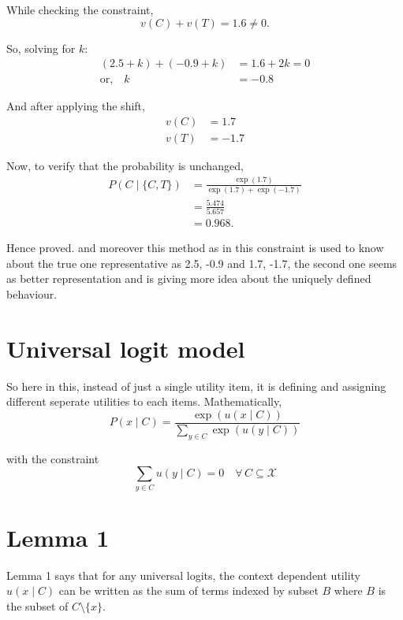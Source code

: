 While checking the constraint,
\begin{equation*}
    v(C) + v(T) = 1.6 \neq 0.
\end{equation*}

So, solving for $k$:
\begin{align*}
    (2.5+k) + (-0.9+k) &= 1.6 + 2k = 0 \\
    \text{or,} \quad k &= -0.8
\end{align*}

And after applying the shift,
\begin{align*}
    v(C) &= 1.7 \\
    v(T) &= -1.7
\end{align*}

Now, to verify that the probability is unchanged,
\begin{align*}
    P(C \mid \{C,T\}) &= \frac{\exp(1.7)}{\exp(1.7) + \exp(-1.7)} \\
    &= \frac{5.474}{5.657} \\
    &= 0.968.
\end{align*}

Hence proved. and moreover this method as in this constraint is used to know about the true one representative as
2.5, -0.9 and 1.7, -1.7, the second one seems as better representation and is giving more idea about the uniquely defined behaviour.

\section{Universal logit model}
So here in this, instead of just a single utility item, it is defining and assigning different seperate utilities to each items. Mathematically,
\begin{equation*}
    P(x \mid C) = \frac{\exp(u(x \mid C))}{\displaystyle\sum_{y \in C} \exp(u(y \mid C))}
\end{equation*}

with the constraint
\begin{equation*}
    \sum_{y \in C} u(y \mid C) = 0 \quad \forall\, C \subseteq \mathcal{X}
\end{equation*}

\section{Lemma 1}

Lemma 1 says that for any universal logits, the context dependent
utility $u(x \mid C)$ can be written as the sum of terms indexed by
subset $B$ where $B$ is the subset of $C \setminus \{x\}$. \cite{seshadri2019}

